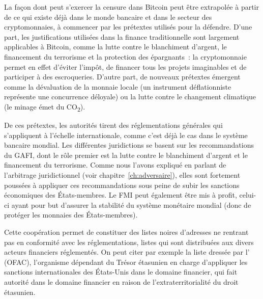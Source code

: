 La façon dont peut s'exercer la censure dans Bitcoin peut être extrapolée à partir de ce qui existe déjà dans le monde bancaire et dans le secteur des cryptomonnaies, à commencer par les prétextes utilisés pour la défendre. D'une part, les justifications utilisées dans la finance traditionnelle sont largement applicables à Bitcoin, comme la lutte contre le blanchiment d'argent, le financement du terrorisme et la protection des épargnants~: la cryptomonnaie permet en effet d'éviter l'impôt, de financer tous les projets imaginables et de participer à des escroqueries. D'autre part, de nouveaux prétextes émergent comme la dévaluation de la monnaie locale (un instrument déflationniste représente une concurrence déloyale) ou la lutte contre le changement climatique (le minage émet du CO\textsubscript{2}).

De ces prétextes, les autorités tirent des réglementations générales qui s'appliquent à l'échelle internationale, comme c'est déjà le cas dans le système bancaire mondial. Les différentes juridictions se basent sur les recommandations du GAFI, dont le rôle premier est la lutte contre le blanchiment d'argent et le financement du terrorisme. Comme nous l'avons expliqué en parlant de l'arbitrage juridictionnel (voir chapitre~\ref{ch:adversaire}), elles sont fortement poussées à appliquer ces recommandations sous peine de subir les sanctions économiques des États-membres. Le FMI peut également être mis à profit, celui-ci ayant pour but d'assurer la stabilité du système monétaire mondial (donc de protéger les monnaies des États-membres). %

Cette coopération permet de constituer des listes noires d'adresses ne rentrant pas en conformité avec les réglementations, listes qui sont distribuées aux divers acteurs financiers réglementés. On peut citer par exemple la liste dressée par l' (OFAC), l'organisme dépendant du Trésor étasunien en charge d'appliquer les sanctions internationales des États-Unis dans le domaine financier, qui fait autorité dans le domaine financier en raison de l'extraterritorialité du droit étasunien.

